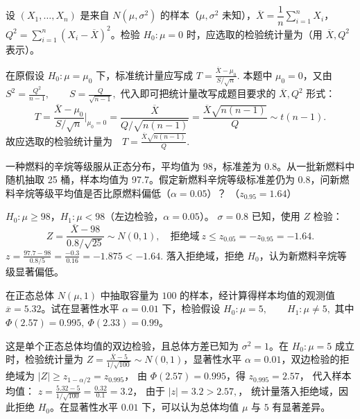 \documentclass[lang=cn,11pt]{elegantbook}
\begin{document}
\begin{exercise}[检验统计量的表达式] \label{ex:ht_stat}
设 \((X_1,\dots,X_n)\) 是来自 \(N(\mu,\sigma^2)\) 的样本（\(\mu,\sigma^2\) 未知），\(\overline{X}=\dfrac{1}{n}\displaystyle\sum_{i=1}^{n}X_i\)，\(Q^2=\displaystyle\sum_{i=1}^{n}(X_i-\overline{X})^2\)。检验 \(H_0\colon\mu=0\) 时，应选取的检验统计量为\underline{\qquad}（用 \(\overline{X},Q^2\) 表示）。
\end{exercise}
\begin{solution}
在原假设 \(H_0\colon \mu=\mu_0\) 下，标准统计量应写成
\(
T=\frac{\overline{X}-\mu_0}{S/\sqrt{n}}.
\)
本题中 \(\mu_0=0\)，又由
\(
S^2=\frac{Q^2}{n-1},\qquad S=\frac{Q}{\sqrt{n-1}},
\)
代入即可把统计量改写成题目要求的 \(\overline{X},Q^2\) 形式：
\[
T=\frac{\overline{X}-\mu_0}{S/\sqrt{n}}\bigg|_{\mu_0=0}
=\frac{\overline{X}}{Q/\sqrt{n(n-1)}}=\frac{\overline{X}\sqrt{n(n-1)}}{Q}\sim t(n-1).
\]
\(
\text{故应选取的检验统计量为}\quad T=\frac{\overline{X}\sqrt{n(n-1)}}{Q}.
\)
\end{solution}


\begin{exercise} \label{ex:ht_z_left}
一种燃料的辛烷等级服从正态分布，平均值为 98，标准差为 0.8。从一批新燃料中随机抽取 25 桶，样本均值为 97.7。假定新燃料辛烷等级标准差仍为 0.8，问新燃料辛烷等级平均值是否比原燃料偏低（\(\alpha=0.05\)）？
（\(z_{0.95}=1.64\)）
\end{exercise}
\begin{solution}
\(H_0\colon\mu\geq98\)，\(H_1\colon\mu<98\)（左边检验，\(\alpha=0.05\)）。
\(\sigma=0.8\) 已知，使用 \(Z\) 检验：
\[
Z=\frac{\overline{X}-98}{0.8/\sqrt{25}}\sim N(0,1),\quad\text{拒绝域}\ z\leq z_{0.05}=-z_{0.95}=-1.64.
\]
\(
z=\frac{97.7-98}{0.8/5}=\frac{-0.3}{0.16}=-1.875<-1.64.
\)
落入拒绝域，拒绝 \(H_0\)，认为新燃料辛烷等级显著偏低。
\end{solution}



\begin{exercise}\label{exer:src-2004-3a-09}
在正态总体 \(N(\mu,1)\) 中抽取容量为 \(100\) 的样本，经计算得样本均值的观测值 \(\overline{x}=5.32\)。试在显著性水平 \(\alpha=0.01\) 下，检验假设
\(
H_0:\mu=5,\qquad H_1:\mu\ne 5,
\)
其中 \(\Phi(2.57)=0.995,\ \Phi(2.33)=0.99\)。
\end{exercise}
\begin{solution}
这是单个正态总体均值的双边检验，且总体方差已知为 \(\sigma^2=1\)。在 \(H_0:\mu=5\) 成立时，检验统计量为
\(
Z=\frac{\overline{X}-5}{1/\sqrt{100}}\sim N(0,1)
\)，显著性水平 \(\alpha=0.01\)，双边检验的拒绝域为
\(
|Z|\ge z_{1-\alpha/2}=z_{0.995}
\)，
由 \(\Phi(2.57)=0.995\)，得
\(
z_{0.995}=2.57
\)，
代入样本均值：
\(
z=\frac{5.32-5}{1/\sqrt{100}}
=\frac{0.32}{0.1}
=3.2
\)，
由于
\(
|z|=3.2>2.57,
\)，
统计量落入拒绝域，因此拒绝 \(H_0\)。在显著性水平 \(0.01\) 下，可以认为总体均值 \(\mu\) 与 \(5\) 有显著差异。
\end{solution}
\end{document}

